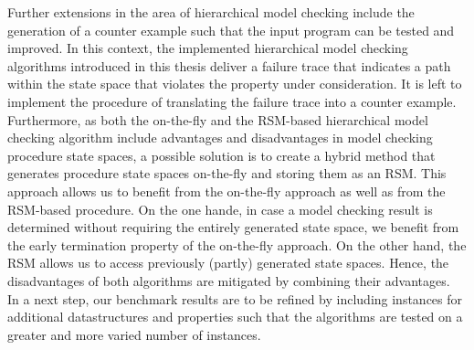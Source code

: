 \documentclass[a4paper, 12pt, twoside]{report}
\begin{document}
	Further extensions in the area of hierarchical model checking include the generation of a counter example such that the input program can be tested and improved. In this context, the implemented hierarchical model checking algorithms introduced in this thesis deliver a failure trace that indicates a path within the state space that violates the property under consideration. It is left to implement the procedure of translating the failure trace into a counter example.\\
	
	Furthermore, as both the on-the-fly and the RSM-based hierarchical model checking algorithm include advantages and disadvantages in model checking procedure state spaces, a possible solution is to create a hybrid method that generates procedure state spaces on-the-fly and storing them as an RSM. This approach allows us to benefit from the on-the-fly approach as well as from the RSM-based procedure. On the one hande, in case a model checking result is determined without requiring the entirely generated state space, we benefit from the early termination property of the on-the-fly approach. On the other hand, the RSM allows us to access previously (partly) generated state spaces. Hence, the disadvantages of both algorithms are mitigated by combining their advantages. \\
	
	In a next step, our benchmark results are to be refined by including instances for additional datastructures and properties such that the algorithms are tested on a greater and more varied number of instances.	
	
	
	{}
	
\end{document}
